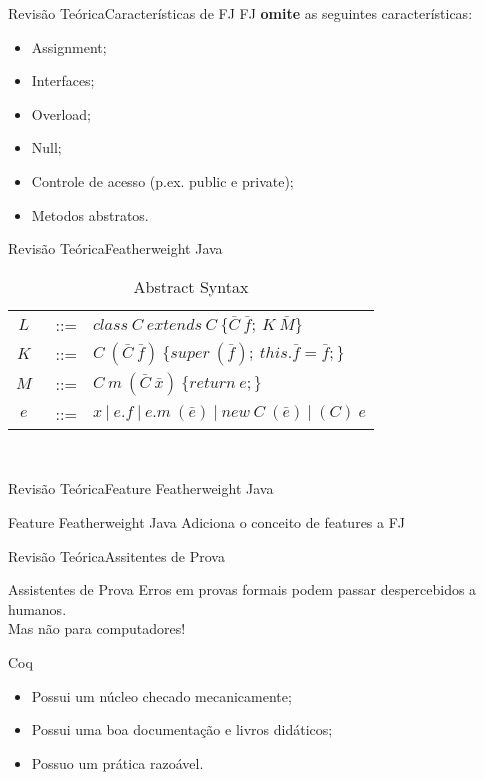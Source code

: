\documentclass{beamer}
\begin{document}
	\begin{frame}{Revisão Teórica}{Características de FJ}
		FJ \textbf{omite} as seguintes características:
		\begin{itemize}
			\item Assignment;
			\item Interfaces;
			\item Overload;
			\item Null;
			\item Controle de acesso (p.ex. public e private);
			\item Metodos abstratos.
		\end{itemize}
	 \end{frame}
	
	\begin{frame}{Revisão Teórica}{Featherweight Java}
		\centering
		\begin{table}[ht!]
			\caption{Abstract Syntax}
			\begin{tabular}{ccl}
				$L$&~::= & $class\ C~extends~C\ \{\bar{C} \ \bar{f};\ K\
				\bar{M}\}$\\ 
				\vspace{0.8mm}
				$K$&~::= &
				$C~(\bar{C}~\bar{f})\
				\{super~(\bar{f});~this.\bar{f}=\bar{f};\}$\\
				\vspace{0.8mm}
				$M$&~::= & $C~m~(\bar{C}~\bar{x})\ \{return~e;\}$\\
				\vspace{0.8mm}
				$e$&~::= & $x~|~e.f~|~e.m~(\bar{e})~|~new~C~(\bar{e})~|~(C)~e$ \\
			\end{tabular} \\
			\vspace{1.5mm}
			\label{abstractsyntax}
		\end{table}
	\end{frame}
	
	\begin{frame}{Revisão Teórica}{Feature Featherweight Java}
		\centering
		\begin{block}{Feature Featherweight Java}
			Adiciona o conceito de features a FJ
		\end{block}
	\end{frame}

	
	\begin{frame}{Revisão Teórica}{Assitentes de Prova}
		\centering
		\begin{block}{Assistentes de Prova}
			Erros em provas formais podem passar despercebidos a humanos.\\
			Mas não para computadores!
		\end{block}
		
		\begin{block}{Coq}
			\begin{itemize}
				\item Possui um núcleo checado mecanicamente;
				\item Possui uma boa documentação e livros didáticos;
				\item Possuo um prática razoável.
			\end{itemize}
		\end{block}
	\end{frame}
\end{document}
